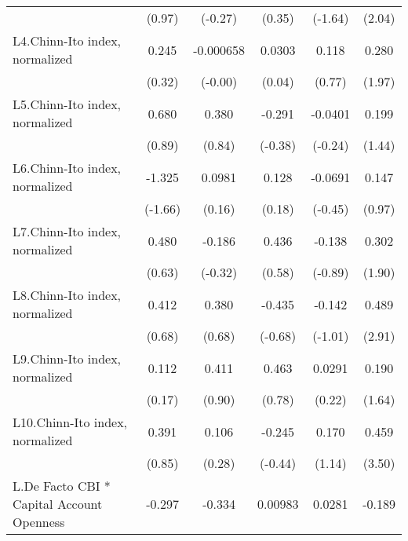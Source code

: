 {\begin{longtable}{l*{5}{c}}
                &   (0.97)         &  (-0.27)         &   (0.35)         &  (-1.64)         &   (2.04)         \\
[1em]
L4.Chinn-Ito index, normalized&    0.245         &-0.000658         &   0.0303         &    0.118         &    0.280         \\
                &   (0.32)         &  (-0.00)         &   (0.04)         &   (0.77)         &   (1.97)         \\
[1em]
L5.Chinn-Ito index, normalized&    0.680         &    0.380         &   -0.291         &  -0.0401         &    0.199         \\
                &   (0.89)         &   (0.84)         &  (-0.38)         &  (-0.24)         &   (1.44)         \\
[1em]
L6.Chinn-Ito index, normalized&   -1.325         &   0.0981         &    0.128         &  -0.0691         &    0.147         \\
                &  (-1.66)         &   (0.16)         &   (0.18)         &  (-0.45)         &   (0.97)         \\
[1em]
L7.Chinn-Ito index, normalized&    0.480         &   -0.186         &    0.436         &   -0.138         &    0.302         \\
                &   (0.63)         &  (-0.32)         &   (0.58)         &  (-0.89)         &   (1.90)         \\
[1em]
L8.Chinn-Ito index, normalized&    0.412         &    0.380         &   -0.435         &   -0.142         &    0.489\sym{**} \\
                &   (0.68)         &   (0.68)         &  (-0.68)         &  (-1.01)         &   (2.91)         \\
[1em]
L9.Chinn-Ito index, normalized&    0.112         &    0.411         &    0.463         &   0.0291         &    0.190         \\
                &   (0.17)         &   (0.90)         &   (0.78)         &   (0.22)         &   (1.64)         \\
[1em]
L10.Chinn-Ito index, normalized&    0.391         &    0.106         &   -0.245         &    0.170         &    0.459\sym{***}\\
                &   (0.85)         &   (0.28)         &  (-0.44)         &   (1.14)         &   (3.50)         \\
[1em]
L.De Facto CBI * Capital Account Openness&   -0.297         &   -0.334\sym{*}  &  0.00983         &   0.0281         &   -0.189         \\

\end{longtable}}
